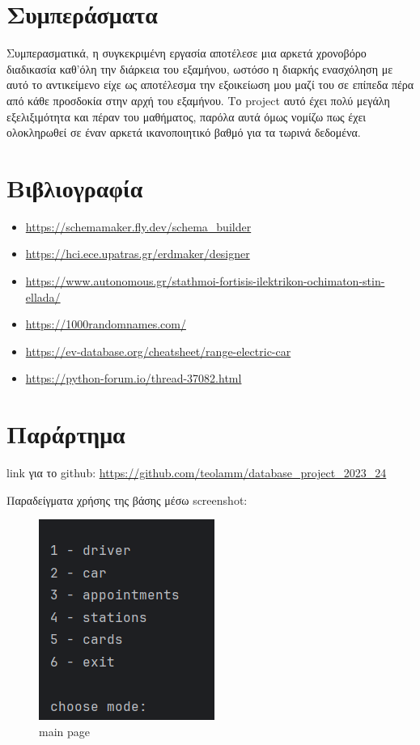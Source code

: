 \documentclass[manuscript,screen,review]{acmart}
\newcommand{\en}[1]{\foreignlanguage{english}{#1}}
\begin{document}
\section{Συμπεράσματα}


Συμπερασματικά, η συγκεκριμένη εργασία αποτέλεσε μια αρκετά χρονοβόρο διαδικασία καθ'όλη την διάρκεια του εξαμήνου, ωστόσο η διαρκής ενασχόληση με αυτό το αντικείμενο είχε ως αποτέλεσμα την εξοικείωση μου μαζί του σε επίπεδα πέρα από κάθε προσδοκία στην αρχή του εξαμήνου. Το \en{project} αυτό έχει πολύ
μεγάλη εξελιξιμότητα και πέραν του μαθήματος, παρόλα αυτά όμως νομίζω πως έχει ολοκληρωθεί σε έναν 
αρκετά ικανοποιητικό βαθμό για τα τωρινά δεδομένα.

\section{Βιβλιογραφία}

\begin{itemize}
\item \en{\url{https://schemamaker.fly.dev/schema_builder}}
\item \en{\url{https://hci.ece.upatras.gr/erdmaker/designer}}
\item \en{\url{https://www.autonomous.gr/stathmoi-fortisis-ilektrikon-ochimaton-stin-ellada/}}
\item \en{\url{https://1000randomnames.com/}}
\item \en{\url{https://ev-database.org/cheatsheet/range-electric-car}}
\item \en{\url{https://python-forum.io/thread-37082.html}}
\end{itemize}

\newpage
\section{Παράρτημα}

\en{link} για το \en{github}: \en{\url{https://github.com/teolamm/database_project_2023_24}}

Παραδείγματα χρήσης της βάσης μέσω \en{screenshot}:

\begin{figure}[H]
    \centering
    \includegraphics[width=.3\textwidth]{./db_edit_1.png}
    \caption{\en{main page}}
\end{figure}
\end{document}
